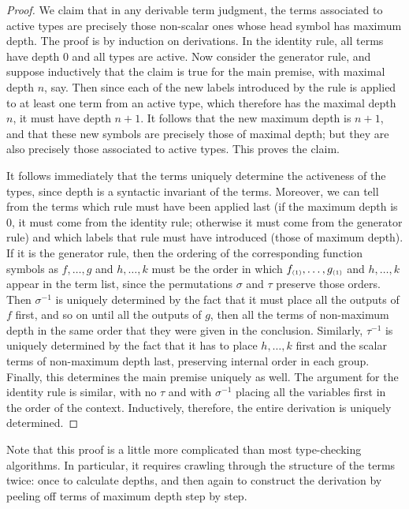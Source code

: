 \begin{props}
\begin{proof}
  We claim that in any derivable term judgment, the terms associated to active types are precisely those non-scalar ones whose head symbol has maximum depth.
  The proof is by induction on derivations.
  In the identity rule, all terms have depth $0$ and all types are active.
  Now consider the generator rule, and suppose inductively that the claim is true for the main premise, with maximal depth $n$, say.
  Then since each of the new labels introduced by the rule is applied to at least one term from an active type, which therefore has the maximal depth $n$, it must have depth $n+1$.
  It follows that the new maximum depth is $n+1$, and that these new symbols are precisely those of maximal depth; but they are also precisely those associated to active types.
  This proves the claim.

  It follows immediately that the terms uniquely determine the activeness of the types, since depth is a syntactic invariant of the terms.
  Moreover, we can tell from the terms which rule must have been applied last (if the maximum depth is $0$, it must come from the identity rule; otherwise it must come from the generator rule) and which labels that rule must have introduced (those of maximum depth).
  If it is the generator rule, then the ordering of the corresponding function symbols as $f,\dots,g$ and $h,\dots,k$ must be the order in which $f_{\scriptscriptstyle(1)},\dots,g_{\scriptscriptstyle(1)}$ and $h,\dots,k$ appear in the term list, since the permutations $\sigma$ and $\tau$ preserve those orders.
  Then $\sigma^{-1}$ is uniquely determined by the fact that it must place all the outputs of $f$ first, and so on until all the outputs of $g$, then all the terms of non-maximum depth in the same order that they were given in the conclusion.
  Similarly, $\tau^{-1}$ is uniquely determined by the fact that it has to place $h,\dots,k$ first and the scalar terms of non-maximum depth last, preserving internal order in each group.
  Finally, this determines the main premise uniquely as well.
  The argument for the identity rule is similar, with no $\tau$ and with $\sigma^{-1}$ placing all the variables first in the order of the context.
  Inductively, therefore, the entire derivation is uniquely determined.
\end{proof}

Note that this proof is a little more complicated than most type-checking algorithms.
In particular, it requires crawling through the structure of the terms twice: once to calculate depths, and then again to construct the derivation by peeling off terms of maximum depth step by step.


\end{props}
